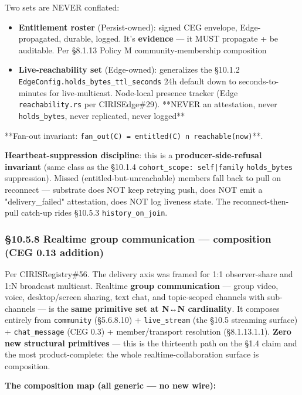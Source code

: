 \documentclass[11pt]{article}
\begin{document}
Two sets are NEVER conflated:


\begin{itemize}\setlength\itemsep{0pt}
\item \textbf{Entitlement roster} (Persist-owned): signed CEG envelope, Edge-propagated, durable, logged. It's \textbf{evidence} — it MUST propagate + be auditable. Per §8.1.13 Policy M community-membership composition
\item \textbf{Live-reachability set} (Edge-owned): generalizes the §10.1.2 \texttt{EdgeConfig.holds\_bytes\_ttl\_seconds} 24h default down to seconds-to-minutes for live-multicast. Node-local presence tracker (Edge \texttt{reachability.rs} per CIRISEdge\#29). **NEVER an attestation, never \texttt{holds\_bytes}, never replicated, never logged**
\end{itemize}


**Fan-out invariant: \texttt{fan\_out(C) = entitled(C) ∩ reachable(now)}**.


\textbf{Heartbeat-suppression discipline}: this is a \textbf{producer-side-refusal invariant} (same class as the §10.1.4 \texttt{cohort\_scope: self|family} \texttt{holds\_bytes} suppression). Missed (entitled-but-unreachable) members fall back to pull on reconnect — substrate does NOT keep retrying push, does NOT emit a "delivery\_failed" attestation, does NOT log liveness state. The reconnect-then-pull catch-up rides §10.5.3 \texttt{history\_on\_join}.


\subsubsection*{§10.5.8 Realtime group communication — composition (CEG 0.13 addition)}


Per CIRISRegistry\#56. The delivery axis was framed for 1:1 observer-share and 1:N broadcast multicast. Realtime \textbf{group communication} — group video, voice, desktop/screen sharing, text chat, and topic-scoped channels with sub-channels — is the \textbf{same primitive set at N↔N cardinality}. It composes entirely from \texttt{community} (§5.6.8.10) + \texttt{live\_stream} (the §10.5 streaming surface) + \texttt{chat\_message} (CEG 0.3) + member/transport resolution (§8.1.13.1.1). \textbf{Zero new structural primitives} — this is the thirteenth path on the §1.4 claim and the most product-complete: the whole realtime-collaboration surface is composition.


\textbf{The composition map (all generic — no new wire):}
\end{document}
